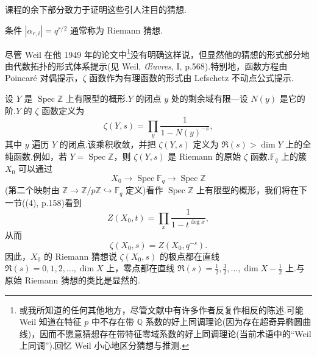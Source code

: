 课程的余下部分致力于证明这些引人注目的猜想.

条件 $|\alpha_{r,i}| = q^{r/2}$ 通常称为 Riemann 猜想.

尽管 Weil 在他 1949 年的论文中\footnote{或我所知道的任何其他地方，尽管文献中有许多作者反复作相反的陈述.可能 Weil 知道在特征 $p$ 中不存在带 $\mathbb{Q}$ 系数的好上同调理论(因为存在超奇异椭圆曲线)，因而不愿意猜想存在带特征零域系数的好上同调理论(当前术语中的``Weil 上同调'').回忆 Weil 小心地区分猜想与推测.}没有明确这样说，但显然他的猜想的形式部分地由代数拓扑的形式体系提示(见 Weil, \emph{Œuvres}, I, p.568).特别地，函数方程由 Poincar\'e 对偶提示，$\zeta$ 函数作为有理函数的形式由 Lefschetz 不动点公式提示.

\begin{remark}\label{rem:26.1}
设 $Y$ 是 $\operatorname{Spec} \mathbb{Z}$ 上有限型的概形.$Y$ 的闭点 $y$ 处的剩余域有限---设 $N(y)$ 是它的阶.$Y$ 的 $\zeta$ 函数定义为
\[
\zeta(Y, s) = \prod_{y} \frac{1}{1 - N(y)^{-s}},
\]
其中 $y$ 遍历 $Y$ 的闭点.该乘积收敛，并把 $\zeta(Y, s)$ 定义为 $\Re(s) > \dim Y$ 上的全纯函数.例如，若 $Y = \operatorname{Spec} \mathbb{Z}$，则 $\zeta(Y, s)$ 是 Riemann 的原始 $\zeta$ 函数.$\mathbb{F}_q$ 上的簇 $X_0$ 可以通过
\[
X_0 \to \operatorname{Spec} \mathbb{F}_q \to \operatorname{Spec} \mathbb{Z}
\]
(第二个映射由 $\mathbb{Z} \to \mathbb{Z}/p\mathbb{Z} \hookrightarrow \mathbb{F}_q$ 定义)看作 $\operatorname{Spec} \mathbb{Z}$ 上有限型的概形，我们将在下一节((4), p.158)看到
\[
Z(X_0, t) = \prod_{x} \frac{1}{1 - t^{\deg x}},
\]
从而
\[
\zeta(X_0, s) = Z(X_0, q^{-s}).
\]
因此，$X_0$ 的 Riemann 猜想说 $\zeta(X_0, s)$ 的极点都在直线 $\Re(s) = 0, 1, 2, \ldots, \dim X$ 上，零点都在直线 $\Re(s) = \frac{1}{2}, \frac{3}{2}, \ldots, \dim X - \frac{1}{2}$ 上.与原始 Riemann 猜想的类比是显然的.
\end{remark}
